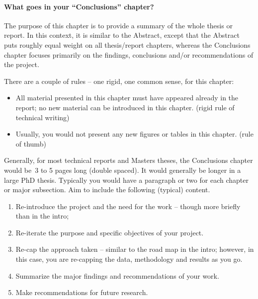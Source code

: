 \documentclass{swfcthesis}
\begin{document}

\paragraph{What goes in your ``Conclusions'' chapter?}

{ The purpose of this chapter is to provide a summary of the
  whole thesis or report.  In this context, it is similar to the Abstract, except that the
  Abstract puts roughly equal weight on all thesis/report chapters, whereas the
  Conclusions chapter focuses primarily on the findings, conclusions and/or
  recommendations of the project.

  There are a couple of rules – one rigid, one common sense, for this chapter:
  \begin{itemize}
  \item All material presented in this chapter must have appeared already in the report;
    no new material can be introduced in this chapter. (rigid rule of technical writing)
  \item Usually, you would not present any new figures or tables in this chapter. (rule of thumb)
  \end{itemize}

  Generally, for most technical reports and Masters theses, the Conclusions chapter would
  be~3 to 5 pages long (double spaced).  It would generally be longer in a large PhD
  thesis. Typically you would have a paragraph or two for each chapter or major
  subsection.  Aim to include the following (typical) content.
  \begin{enumerate}
  \item Re-introduce the project and the need for the work – though more briefly than in
    the intro;
  \item Re-iterate the purpose and specific objectives of your project.
  \item Re-cap the approach taken – similar to the road map in the intro; however, in this
    case, you are re-capping the data, methodology and results as you go.
  \item Summarize the major findings and recommendations of your work.
  \item Make recommendations for future research.
  \end{enumerate}}

\end{document}
